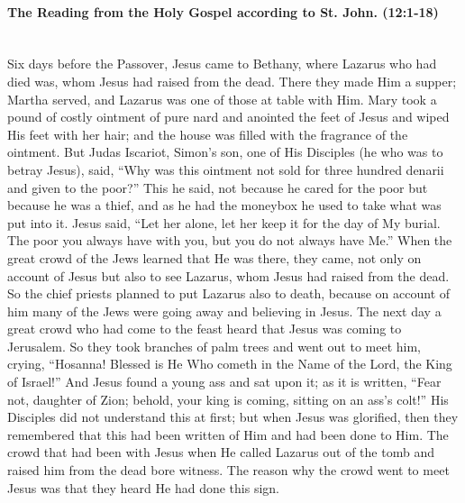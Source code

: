 \documentclass[twoside, letterpaper, 12pt]{report}
\begin{document}


\paragraph{The Reading from the Holy Gospel according to St. John. (12:1-18)}\mbox{}\\

Six days before the Passover, Jesus came to Bethany, where Lazarus who had died was,
whom Jesus had raised from the dead. There they made Him a supper; Martha served, and Lazarus
was one of those at table with Him. Mary took a pound of costly ointment of pure nard and anointed
the feet of Jesus and wiped His feet with her hair; and the house was filled with the fragrance of
the ointment. But Judas Iscariot, Simon’s son, one of His Disciples (he who was to betray Jesus),
said, “Why was this ointment not sold for three hundred denarii and given to the poor?” This he
said, not because he cared for the poor but because he was a thief, and as he had the moneybox he
used to take what was put into it. Jesus said, “Let her alone, let her keep it for the day of My burial.
The poor you always have with you, but you do not always have Me.” When the great crowd of
the Jews learned that He was there, they came, not only on account of Jesus but also to see Lazarus,
whom Jesus had raised from the dead. So the chief priests planned to put Lazarus also to death,
because on account of him many of the Jews were going away and believing in Jesus. The next
day a great crowd who had come to the feast heard that Jesus was coming to Jerusalem. So they
took branches of palm trees and went out to meet him, crying, “Hosanna! Blessed is He Who
cometh in the Name of the Lord, the King of Israel!” And Jesus found a young ass and sat upon it;
as it is written, “Fear not, daughter of Zion; behold, your king is coming, sitting on an ass’s colt!”
His Disciples did not understand this at first; but when Jesus was glorified, then they remembered
that this had been written of Him and had been done to Him. The crowd that had been with Jesus
when He called Lazarus out of the tomb and raised him from the dead bore witness. The reason
why the crowd went to meet Jesus was that they heard He had done this sign.
\end{document}
